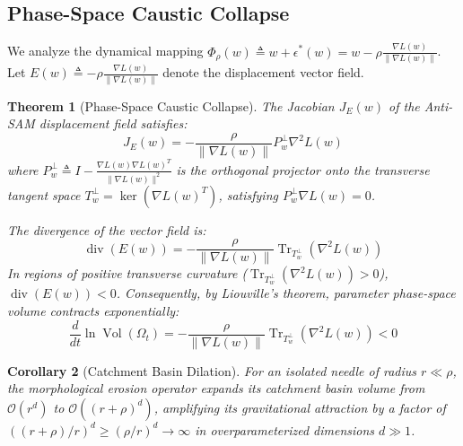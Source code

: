 \documentclass[11pt,a4paper]{article}
\newtheorem{theorem}{Theorem}
\newtheorem{corollary}[theorem]{Corollary}
\begin{document}
\subsection{Phase-Space Caustic Collapse}
We analyze the dynamical mapping $\Phi_\rho(w) \triangleq w + \epsilon^*(w) = w - \rho \frac{\nabla L(w)}{\|\nabla L(w)\|}$.
Let $E(w) \triangleq -\rho \frac{\nabla L(w)}{\|\nabla L(w)\|}$ denote the displacement vector field.

\begin{theorem}[Phase-Space Caustic Collapse]
The Jacobian $J_E(w)$ of the Anti-SAM displacement field satisfies:
\begin{equation}
J_E(w) = -\frac{\rho}{\|\nabla L(w)\|} P_w^\perp \nabla^2 L(w)
\end{equation}
where $P_w^\perp \triangleq I - \frac{\nabla L(w) \nabla L(w)^T}{\|\nabla L(w)\|^2}$ is the orthogonal projector onto the transverse tangent space $T_w^\perp = \ker(\nabla L(w)^T)$, satisfying $P_w^\perp \nabla L(w) = 0$.

The divergence of the vector field is:
\begin{equation}
\operatorname{div}(E(w)) = -\frac{\rho}{\|\nabla L(w)\|} \operatorname{Tr}_{T_w^\perp}(\nabla^2 L(w))
\end{equation}
In regions of positive transverse curvature ($\operatorname{Tr}_{T_w^\perp}(\nabla^2 L(w)) > 0$), $\operatorname{div}(E(w)) < 0$.
Consequently, by Liouville's theorem, parameter phase-space volume contracts exponentially:
\begin{equation}
\frac{d}{dt} \ln \operatorname{Vol}(\Omega_t) = -\frac{\rho}{\|\nabla L(w)\|} \operatorname{Tr}_{T_w^\perp}(\nabla^2 L(w)) < 0
\end{equation}
\end{theorem}

\begin{corollary}[Catchment Basin Dilation]
For an isolated needle of radius $r \ll \rho$, the morphological erosion operator expands its catchment basin volume from $\mathcal{O}(r^d)$ to $\mathcal{O}((r+\rho)^d)$, amplifying its gravitational attraction by a factor of $((r+\rho)/r)^d \ge (\rho/r)^d \to \infty$ in overparameterized dimensions $d \gg 1$.
\end{corollary}
\end{document}
